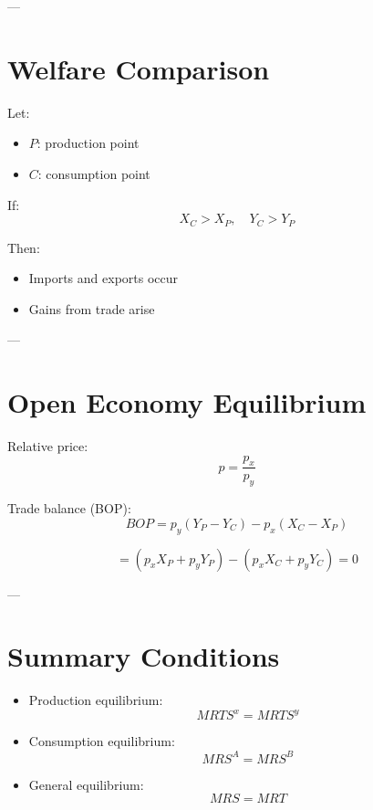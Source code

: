 ---

\section{Welfare Comparison}

Let:
\begin{itemize}
    \item $P$: production point
    \item $C$: consumption point
\end{itemize}

If:
\[
X_C > X_P, \quad Y_C > Y_P
\]

Then:
\begin{itemize}
    \item Imports and exports occur
    \item Gains from trade arise
\end{itemize}

---

\section{Open Economy Equilibrium}

Relative price:
\[
p = \frac{p_x}{p_y}
\]

Trade balance (BOP):
\[
BOP = p_y(Y_P - Y_C) - p_x(X_C - X_P)
\]

\[
= (p_x X_P + p_y Y_P) - (p_x X_C + p_y Y_C) = 0
\]

---

\section{Summary Conditions}

\begin{itemize}
    \item Production equilibrium:
    \[
    MRTS^x = MRTS^y
    \]

    \item Consumption equilibrium:
    \[
    MRS^A = MRS^B
    \]

    \item General equilibrium:
    \[
    MRS = MRT
    \]
\end{itemize}